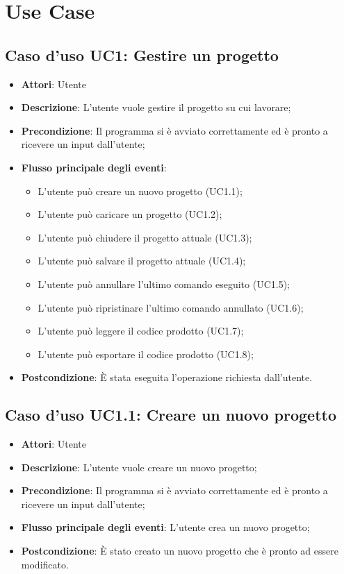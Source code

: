 \documentclass[../AnalisiDeiRequisiti.tex]{subfiles}
\begin{document}
	\section{Use Case}
	\subsection{Caso d'uso UC1: Gestire un progetto}
	\begin{itemize}
		\item \textbf{Attori}: Utente
		\item \textbf{Descrizione}: L'utente vuole gestire il progetto su cui lavorare;
		\item \textbf{Precondizione}: Il programma si è avviato correttamente ed è pronto a ricevere un input dall'utente;
		\item \textbf{Flusso principale degli eventi}: \begin{itemize}
			\item L'utente può creare un nuovo progetto (UC1.1);
			\item L'utente può caricare un progetto (UC1.2);
			\item L'utente può chiudere il progetto attuale (UC1.3);
			\item L'utente può salvare il progetto attuale (UC1.4);
			\item L'utente può annullare l'ultimo comando eseguito (UC1.5);
			\item L'utente può ripristinare l'ultimo comando annullato (UC1.6);
			\item L'utente può leggere il codice prodotto (UC1.7);
			\item L'utente può esportare il codice prodotto (UC1.8);
		\end{itemize}
		\item \textbf{Postcondizione}: È stata eseguita l'operazione richiesta dall'utente.
	\end{itemize}
	\subsection{Caso d'uso UC1.1: Creare un nuovo progetto}
	\begin{itemize}
		\item \textbf{Attori}: Utente
		\item \textbf{Descrizione}: L'utente vuole creare un nuovo progetto;
		\item \textbf{Precondizione}: Il programma si è avviato correttamente ed è pronto a ricevere un input dall'utente;
		\item \textbf{Flusso principale degli eventi}: L'utente crea un nuovo progetto;
		\item \textbf{Postcondizione}: È stato creato un nuovo progetto che è pronto ad essere modificato.
	\end{itemize}
\end{document}
